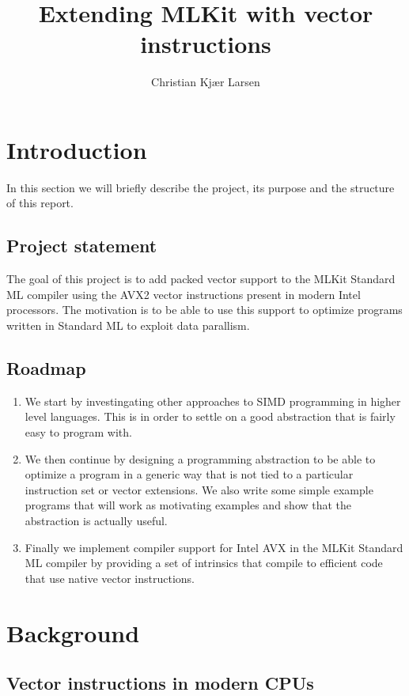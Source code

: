 \documentclass{article}
\title{Extending MLKit with vector instructions}
\author{Christian Kjær Larsen}
\begin{document}
\maketitle

\section{Introduction}

In this section we will briefly describe the project, its purpose and the structure of this report.

\subsection{Project statement}

The goal of this project is to add packed vector support to the MLKit\cite{mlkit} Standard ML compiler using the AVX2 vector instructions present in modern Intel processors. The motivation is to be able to use this support to optimize programs written in Standard ML to exploit data parallism.

\subsection{Roadmap}

\begin{enumerate}
    \item We start by investingating other approaches to SIMD programming in higher level languages. This is in order to settle on a
        good abstraction that is fairly easy to program with.
    \item
        We then continue by designing a programming abstraction to be able to optimize a program in a generic way that is not tied to a particular instruction set or vector extensions.
        We also write some simple example programs that will work as motivating examples and show that the abstraction is actually useful.
    \item
        Finally we implement compiler support for Intel AVX in the MLKit Standard ML compiler by providing a set of intrinsics that compile to efficient code that use native vector instructions.
\end{enumerate}

\section{Background}

\subsection{Vector instructions in modern CPUs}
\end{document}
